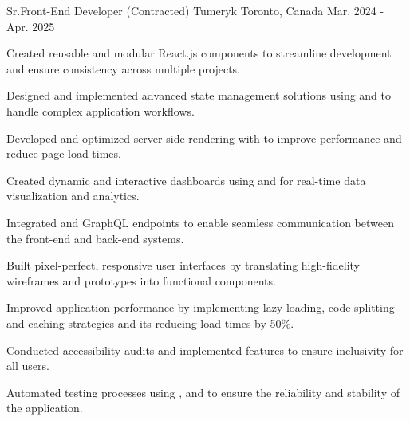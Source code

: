 

\begin{cventries}

  \cvnewexperience
    {Sr.Front-End Developer (Contracted)} %
    {Tumeryk} %
    {Toronto, Canada} %
    {Mar. 2024 - Apr. 2025} %
    {
      \begin{cvitems} %
        \item {Created reusable and modular React.js components to streamline development and ensure consistency across multiple projects.}
        \item {Designed and implemented advanced state management solutions using  and  to handle complex application workflows.}
        \item {Developed and optimized server-side rendering  with  to improve  performance and reduce page load times.}
        \item {Created dynamic and interactive dashboards using  and  for real-time data visualization and analytics.}
        \item {Integrated  and GraphQL endpoints to enable seamless communication between the front-end and back-end systems.}
        \item {Built pixel-perfect, responsive user interfaces by translating high-fidelity wireframes and prototypes into functional components.}
        \item {Improved application performance by implementing lazy loading, code splitting and caching strategies and its reducing load times by 50\%.}
        \item {Conducted accessibility audits and implemented  features to ensure inclusivity for all users.}
        \item {Automated testing processes using , and  to ensure the reliability and stability of the application.}

\end{cvitems}}
\end{cventries}
